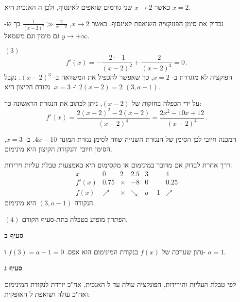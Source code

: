 כאשר 
$x\rightarrow 2$
שני גורמים שואפים לאינסוף, ולכן ה%
\asm{}
האנכית היא
$x=2$.

נבדוק את סימן הפונקציה השואפת לאינסוף. כאשר
$x\rightarrow 2$,
$\frac{1}{(x-2)^2}\gg\frac{2}{x-2}$
כך ש-%
$y\rightarrow+\infty$
גם מימין וגם משמאל.

$(3)$
\[
f'(x) = -\frac{2\cdot -1}{(x-2)^2} + \frac{-2}{(x-2)^3}=0\,.
\]
הפוקציה לא מוגדרת ב-%
$x=2$,
כך שאפשר להכפיל את המשוואה ב-%
$(x-2)^3$.
נקבל
$2(x-2)=2$
ו-%
$x=3$.
נקודת הקיצון היא
$(3,a-1)$.

על ידי הכפלה בחזקות של
$(x-2)$,
ניתן לכתוב את הנגזרת הראשונה כך:
\[
f'(x) = \frac{2(x-2)^2-2(x-2)}{(x-2)^4}=\frac{2x^2-10x+12}{(x-2)^4}\,.
\]

\np

המכנה חיובי לכן הסימן של הנגזרת השנייה שווה לסימן נגזרת המונה
$4x-10$.
ב-%
$x=3$,
הסימן חיובי והנקודת הקיצון היא מינימום.

דרך אחרת לבדוק אם מדובר במינימום או מקסימום היא באמצעות טבלת עליות וירידות:
\[
\begin{array}{c|c|c|c|c|c}
x & 0 & 2 & 2.5 & 3 & 4\\\hline
f'(x) & 0.75 & \times & -8& 0 & 0.25\\\hline
f(x) & \nearrow & \times & \searrow & a-1 & \nearrow
\end{array}
\]
הנקודה
$(3,a-1)$
היא מינימום.

$(4)$
הפתרון מופיע בטבלה בתת-סעיף הקודם.

\textbf{סעיף ב}

נתון שערכה של
$f(x)$
בנקודת המינימום הוא אפס.
$f(3)=a-1=0$
ו-%
$a=1$.

\textbf{סעיף ג}

לפי טבלת העליות והירידות, הפונקציה עולה עד ל%
\asm{}
האנכית, אח"כ יורדת לנקודת המינימום ואח"כ עולה ושואפת ל%
\asm{}
האופקית:
\begin{center}
\end{center}


